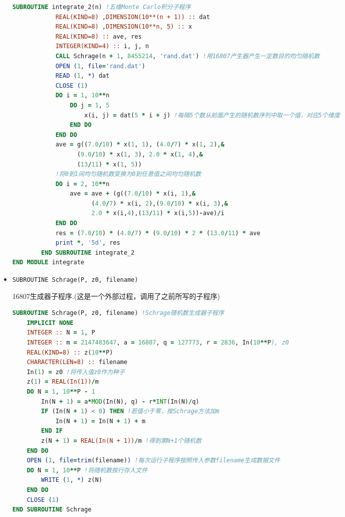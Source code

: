 \documentclass[12pt,a4paper,utf8]{ctexart}
\begin{document}
\begin{itemize}
\begin{framed}
\begin{lstlisting}[language=Fortran]
        SUBROUTINE integrate_2(n) !五维Monte Carlo积分子程序
            REAL(KIND=8) ,DIMENSION(10**(n + 1)) :: dat
            REAL(KIND=8) ,DIMENSION(10**n, 5) :: x
            REAL(KIND=8) :: ave, res
            INTEGER(KIND=4) :: i, j, n
            CALL Schrage(n + 1, 8455214, 'rand.dat') !用16807产生器产生一定数目的均匀随机数
            OPEN (1, file='rand.dat')
            READ (1, *) dat
            CLOSE (1)
            DO i = 1, 10**n
                DO j = 1, 5
                    x(i, j) = dat(5 * i + j) !每隔5个数从前面产生的随机数序列中取一个值，对应5个维度
                END DO
            END DO
            ave = g((7.0/10) * x(1, 1), (4.0/7) * x(1, 2),&
                  (9.0/10) * x(1, 3), 2.0 * x(1, 4),&
                  (13/11) * x(1, 5))
            !将0到1间均匀随机数变换为0到任意值之间均匀随机数
            DO i = 2, 10**n
                ave = ave + (g((7.0/10) * x(i, 1),&
                      (4.0/7) * x(i, 2),(9.0/10) * x(i, 3),&
                      2.0 * x(i,4),(13/11) * x(i,5))-ave)/i
            END DO
            res = (7.0/10) * (4.0/7) * (9.0/10) * 2 * (13.0/11) * ave
            print *, '5d', res
        END SUBROUTINE integrate_2
END MODULE integrate
\end{lstlisting}
\end{framed}

    \item \texttt{SUBROUTINE Schrage(P, z0, filename)}

        16807生成器子程序.(这是一个外部过程，调用了之前所写的子程序)

\begin{framed}
\begin{lstlisting}[language=Fortran]
SUBROUTINE Schrage(P, z0, filename) !Schrage随机数生成器子程序
    IMPLICIT NONE
    INTEGER :: N = 1, P
    INTEGER :: m = 2147483647, a = 16807, q = 127773, r = 2836, In(10**P), z0
    REAL(KIND=8) :: z(10**P)
    CHARACTER(LEN=8) :: filename
    In(1) = z0 !将传入值z0作为种子
    z(1) = REAL(In(1))/m
    DO N = 1, 10**P - 1
        In(N + 1) = a*MOD(In(N), q) - r*INT(In(N)/q)
        IF (In(N + 1) < 0) THEN !若值小于零，按Schrage方法加m
            In(N + 1) = In(N + 1) + m
        END IF
        z(N + 1) = REAL(In(N + 1))/m !得到第N+1个随机数
    END DO
    OPEN (1, file=trim(filename)) !每次运行子程序按照传入参数filename生成数据文件
    DO N = 1, 10**P !将随机数按行存入文件
        WRITE (1, *) z(N)
    END DO
    CLOSE (1)
END SUBROUTINE Schrage
\end{lstlisting}
\end{framed}

    
\end{itemize}
\end{document}
